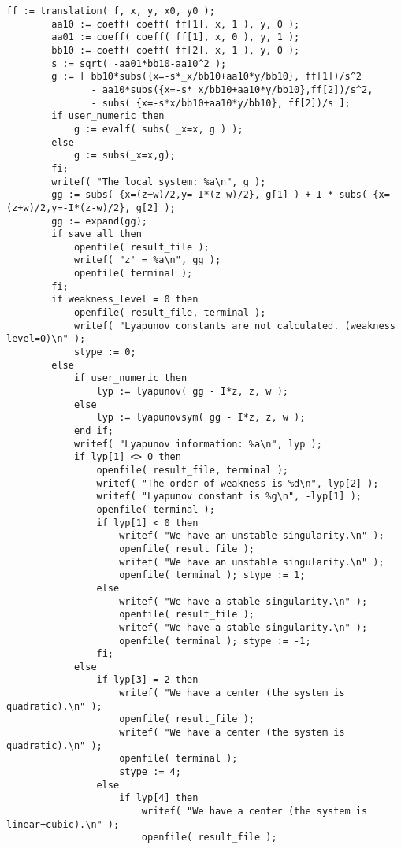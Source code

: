 \documentclass[a4paper,10pt]{article}
\begin{document}
\begin{lstlisting}[name=weakfocus]
        ff := translation( f, x, y, x0, y0 );
        aa10 := coeff( coeff( ff[1], x, 1 ), y, 0 );
        aa01 := coeff( coeff( ff[1], x, 0 ), y, 1 );
        bb10 := coeff( coeff( ff[2], x, 1 ), y, 0 );
        s := sqrt( -aa01*bb10-aa10^2 );
        g := [ bb10*subs({x=-s*_x/bb10+aa10*y/bb10}, ff[1])/s^2
               - aa10*subs({x=-s*_x/bb10+aa10*y/bb10},ff[2])/s^2,
               - subs( {x=-s*x/bb10+aa10*y/bb10}, ff[2])/s ];
        if user_numeric then
            g := evalf( subs( _x=x, g ) );
        else
            g := subs(_x=x,g);
        fi;
        writef( "The local system: %a\n", g );
        gg := subs( {x=(z+w)/2,y=-I*(z-w)/2}, g[1] ) + I * subs( {x=(z+w)/2,y=-I*(z-w)/2}, g[2] );
        gg := expand(gg);
        if save_all then
            openfile( result_file );
            writef( "z' = %a\n", gg );
            openfile( terminal );
        fi;
        if weakness_level = 0 then
            openfile( result_file, terminal );
            writef( "Lyapunov constants are not calculated. (weakness level=0)\n" );
            stype := 0;
        else
            if user_numeric then
                lyp := lyapunov( gg - I*z, z, w );
            else
                lyp := lyapunovsym( gg - I*z, z, w );
            end if;
            writef( "Lyapunov information: %a\n", lyp );
            if lyp[1] <> 0 then
                openfile( result_file, terminal );
                writef( "The order of weakness is %d\n", lyp[2] );
                writef( "Lyapunov constant is %g\n", -lyp[1] );
                openfile( terminal );
                if lyp[1] < 0 then
                    writef( "We have an unstable singularity.\n" );
                    openfile( result_file );
                    writef( "We have an unstable singularity.\n" );
                    openfile( terminal ); stype := 1;
                else
                    writef( "We have a stable singularity.\n" );
                    openfile( result_file );
                    writef( "We have a stable singularity.\n" );
                    openfile( terminal ); stype := -1;
                fi;
            else
                if lyp[3] = 2 then
                    writef( "We have a center (the system is quadratic).\n" );
                    openfile( result_file );
                    writef( "We have a center (the system is quadratic).\n" );
                    openfile( terminal );
                    stype := 4;
                else
                    if lyp[4] then
                        writef( "We have a center (the system is linear+cubic).\n" );
                        openfile( result_file );

\end{lstlisting}
\end{document}
